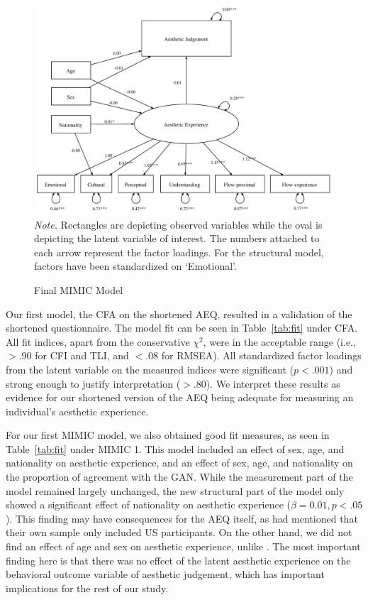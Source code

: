 \documentclass[../main.tex]{subfiles}
\begin{document}
\begin{figure}[!tb]
	\caption{Final MIMIC Model}
	\label{fig:finalmodel}
	\includegraphics[width=1\linewidth]{images/model3.pdf}
	{\textit{Note.} Rectangles are depicting observed variables while the oval is depicting the latent variable of interest. The numbers attached to each arrow represent the factor loadings. For the structural model, factors have been standardized on `Emotional'.}
\end{figure}


Our first model, the CFA on the shortened AEQ, resulted in a validation of the shortened questionnaire. The model fit can be seen in Table~\ref{tab:fit} under CFA. All fit indices, apart from the conservative $\chi^{2}$, were in the acceptable range (i.e., $>.90$ for CFI and TLI, and $<.08$ for RMSEA). All standardized factor loadings from the latent variable on the measured indices were significant ($p<.001$) and strong enough to justify interpretation ($>.80$). We interpret these results as evidence for our shortened version of the AEQ being adequate for measuring an individual's aesthetic experience.

For our first MIMIC model, we also obtained good fit measures, as seen in Table~\ref{tab:fit} under MIMIC 1. This model included an effect of sex, age, and nationality on aesthetic experience, and an effect of sex, age, and nationality on the proportion of agreement with the GAN. While the measurement part of the model remained largely unchanged, the new structural part of the model only showed a significant effect of nationality on aesthetic experience ($\beta = 0.01, p<.05$). This finding may have consequences for the AEQ itself, as \textcite{wanzerExperiencingFlowViewing2020} had mentioned that their own sample only included US participants. On the other hand, we did not find an effect of age and sex on aesthetic experience, unlike \textcite{wanzerExperiencingFlowViewing2020}. The most important finding here is that there was no effect of the latent aesthetic experience on the behavioral outcome variable of aesthetic judgement, which has important implications for the rest of our study.
\end{document}
